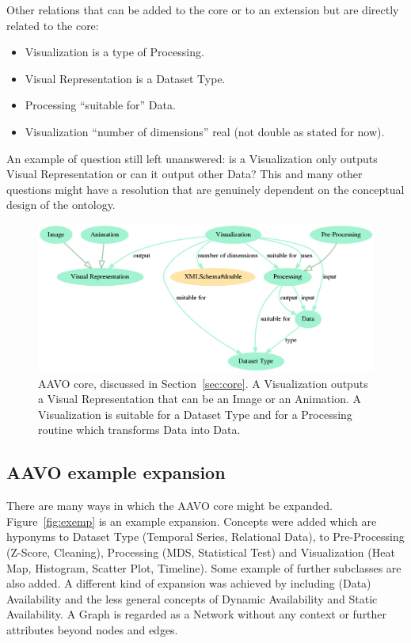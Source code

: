 \documentclass[12pt,fleqn]{article}
\begin{document}
Other relations that can be added to the core or to an extension but
are directly related to the core:
\begin{itemize}
	\item Visualization is a type of Processing.
	\item Visual Representation is a Dataset Type.
	\item Processing ``suitable for'' Data.
	\item Visualization ``number of dimensions'' real (not double as stated for now).
\end{itemize}

An example of question still left unanswered:
is a Visualization only outputs Visual Representation
or can it output other Data?
This and many other questions might have a resolution
that are genuinely dependent on the conceptual design of the ontology.

\begin{figure}[!htbp] %
\vspace{-2pt}
\begin{center}
\includegraphics[width=\textwidth]{../figs/aavo0.01_minimum.png}
	\caption{AAVO core, discussed in Section~\ref{sec:core}.
	A Visualization outputs a Visual Representation that can be an Image or an Animation.
	A Visualization is suitable for a Dataset Type and for a Processing routine which transforms
	Data into Data.}
\label{fig:minimum}%
\end{center}
\end{figure}


\subsection{AAVO example expansion}\label{sec:ext}
There are many ways in which the AAVO core might be expanded.
Figure~\ref{fig:exemp} is an example expansion.
Concepts were added which are hyponyms to Dataset Type (Temporal Series, Relational Data),
to Pre-Processing (Z-Score, Cleaning), Processing (MDS, Statistical Test)
and Visualization (Heat Map, Histogram, Scatter Plot, Timeline).
Some example of further subclasses are also added.
A different kind of expansion was achieved by including (Data) Availability
and the less general concepts of Dynamic Availability and Static Availability.
A Graph is regarded as a Network without any context or further attributes beyond
nodes and edges.
\end{document}
